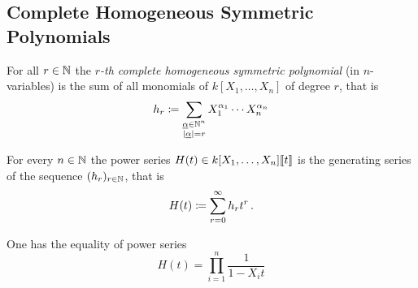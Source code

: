 %   





\subsection{Complete Homogeneous Symmetric Polynomials}


\begin{definition}
  For all $r \in \mathbb{N}$ the \emph{$r$-th complete homogeneous symmetric polynomial} (in $n$-variables) is the sum of all monomials of $k[X_1, \dotsc, X_n]$ of degree $r$, that is
  \[
              h_r
    \coloneqq  \sum_{\substack{\underline{\alpha} \in \mathbb{N}^n \\ |\underline{\alpha}| = r}}
              X_1^{\alpha_1} \dotsm X_n^{\alpha_n}
  \]
\end{definition}


\begin{definition}
  For every $n \in \mathbb{N}$ the power series $H(t) \in k[X_1, \dotsc, X_n]\!\left[\!\left[t\right]\!\right]$ is the generating series of the sequence $(h_r)_{r \in \mathbb{N}}$, that is
  \[
              H(t)
    \coloneqq  \sum_{r=0}^\infty h_r t^r \,.
  \]
\end{definition}


\begin{lemma}
  \label{lemma: explicit formula for H}
  One has the equality of power series
  \[
      H(t)
    = \prod_{i=1}^n \frac{1}{1 - X_i t}
  \]
\end{lemma}



